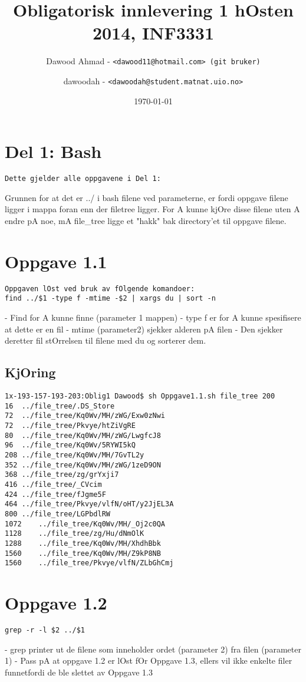 \documentclass{article}
\title{Obligatorisk innlevering 1 hOsten 2014, INF3331}
\author{
  Dawood Ahmad - 
  \texttt{<dawood11@hotmail.com> (git bruker)}
  \and
  dawoodah - 
  \texttt{<dawoodah@student.matnat.uio.no>}
 }
\date{\today}
\begin{document}
\maketitle
\section*{Del 1: Bash}


\begin{Verbatim}
Dette gjelder alle oppgavene i Del 1:
\end{Verbatim}
Grunnen for at det er ../ i bash filene ved parameterne, er fordi oppgave filene ligger i mappa foran enn der filetree ligger.
For A kunne kjOre disse filene uten A endre pA noe, mA file\_tree ligge et "hakk" bak directory'et til oppgave filene.


\section*{Oppgave 1.1}

\begin{Verbatim}
Oppgaven lOst ved bruk av fOlgende komandoer:
find ../$1 -type f -mtime -$2 | xargs du | sort -n
\end{Verbatim}
- Find for A kunne finne (parameter 1 mappen)\hfill \break
- type f er for A kunne spesifisere at dette er en fil\hfill \break
- mtime (parameter2) sjekker alderen pA filen\hfill \break
- Den sjekker deretter fil stOrrelsen til filene med du og sorterer dem.

\subsection*{KjOring}

\begin{Verbatim}
1x-193-157-193-203:Oblig1 Dawood$ sh Oppgave1.1.sh file_tree 200
16	../file_tree/.DS_Store
72	../file_tree/Kq0Wv/MH/zWG/Exw0zNwi
72	../file_tree/Pkvye/htZiVgRE
80	../file_tree/Kq0Wv/MH/zWG/LwgfcJ8
96	../file_tree/Kq0Wv/5RYWI5kQ
208	../file_tree/Kq0Wv/MH/7GvTL2y
352	../file_tree/Kq0Wv/MH/zWG/1zeD9ON
368	../file_tree/zg/grYxji7
416	../file_tree/_CVcim
424	../file_tree/fJgme5F
464	../file_tree/Pkvye/vlfN/oHT/y2JjEL3A
800	../file_tree/LGPbdlRW
1072	../file_tree/Kq0Wv/MH/_Oj2c0QA
1128	../file_tree/zg/Hu/dNmOlK
1288	../file_tree/Kq0Wv/MH/XhdhBbk
1560	../file_tree/Kq0Wv/MH/Z9kP8NB
1560	../file_tree/Pkvye/vlfN/ZLbGhCmj
\end{Verbatim}

\section*{Oppgave 1.2}
\begin{Verbatim}
grep -r -l $2 ../$1
\end{Verbatim}
- grep printer ut de filene som inneholder ordet (parameter 2) fra filen (parameter 1)\hfill \break
- Pass pA at oppgave 1.2 er lOst fOr Oppgave 1.3, ellers vil ikke enkelte filer funnetfordi de ble slettet av Oppgave 1.3
\end{document}
